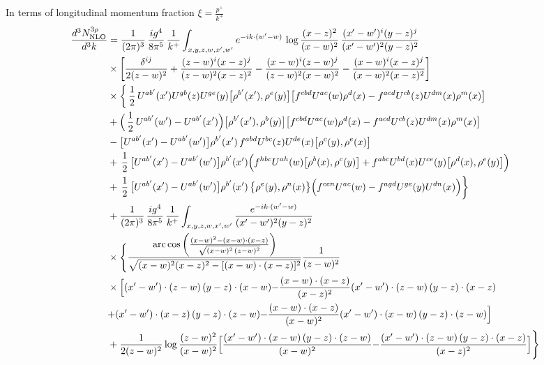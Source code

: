 \documentclass[9pt]{article}
\numberwithin{equation}{section}
\begin{document}
In terms of longitudinal momentum fraction $\xi = \frac{p^{+}}{k^{+}}$
\begin{align}
    \frac{d^{3}N^{3\rho}_{\rm NLO}}{d^{3}k}&=\frac{1}{(2\pi)^{3}}\,\frac{ig^{4}}{8\pi^{5}}\,\frac{1}{k^{+}}\int_{x,y,z,w,x',w'}e^{-ik\cdot(w'-w)}\,\log\frac{(x-z)^{2}}{(x-w)^{2}}\,\frac{(x'-w')^{i}(y-z)^{j}}{(x'-w')^{2}(y-z)^{2}}\notag\\
&\times\bigg[\frac{\delta^{ij}}{2(z-w)^{2}}+\frac{(z-w)^{i}(x-z)^{j}}{(z-w)^{2}(x-z)^{2}}-\frac{(x-w)^{i}(z-w)^{j}}{(z-w)^{2}(x-w)^{2}}-\frac{(x-w)^{i}(x-z)^{j}}{(x-w)^{2}(x-z)^{2}}\bigg]\notag\\
&\times\bigg\{\,\frac{1}{2}\,U^{ab'}(x')U^{gb}(z)U^{ge}(y)\big[\rho^{b'}(x'),\rho^{e}(y)\big]\big[f^{cbd}U^{ac}(w)\rho^{d}(x)-f^{acd}U^{cb}(z)U^{dm}(x)\rho^{m}(x)\big]\notag\\
&+\Big(\,\frac{1}{2}\,U^{ab'}(w')-U^{ab'}(x')\Big)\big[\rho^{b'}(x'),\rho^{b}(y)\big]\big[f^{cbd}U^{ac}(w)\rho^{d}(x)-f^{acd}U^{cb}(z)U^{dm}(x)\rho^{m}(x)\big]\notag\\
&-\big[U^{ab'}(x')-U^{ab'}(w')\big]\rho^{b'}(x')\,f^{abd}U^{bc}(z)U^{de}(x)\big[\rho^{c}(y),\rho^{e}(x)\big]\notag\\
&+\,\frac{1}{2}\,\big[U^{ab'}(x')-U^{ab'}(w')\big]\rho^{b'}(x')\Big(f^{hbc}U^{ah}(w)\big[\rho^{b}(x),\rho^{c}(y)\big]+f^{abc}U^{bd}(x)U^{ce}(y)\big[\rho^{d}(x),\rho^{e}(y)\big]\Big)\notag\\
&+\,\frac{1}{2}\,\big[U^{ab'}(x')-U^{ab'}(w')\big]\rho^{b'}(x')\,\big\{\rho^{e}(y),\rho^{n}(x)\big\}\Big(f^{cen}U^{ac}(w)-f^{agd}U^{ge}(y)U^{dn}(x)\Big)\bigg\}\notag\\
&+\frac{1}{(2\pi)^{3}}\,\frac{ig^{4}}{8\pi^{5}}\,\frac{1}{k^{+}}\int_{x,y,z,w,x',w'}\frac{e^{-ik\cdot(w'-w)}}{(x'-w')^{2}(y-z)^{2}}\notag\\
&\times\Bigg\{\frac{\mathrm{arc\,cos}\left(\frac{(x-w)^{2}-(x-w)\cdot (x-z)}{\sqrt{(x-w)^{2}\,(z-w)^{2}}}\right)}{\sqrt{(x-w)^{2}(x-z)^{2}-[(x-w)\cdot(x-z)]^{2}}}\frac{1}{(z-w)^{2}}\notag\\
&\times\Big[{(x'-w')\cdot(z-w)\,(y-z)\cdot(x-w)}{-\frac{(x-w)\cdot(x-z)}{(x-z)^{2}}(x'-w')\cdot(z-w)\,(y-z)\cdot(x-z)}\notag\\
&{+(x'-w')\cdot(x-z)\,(y-z)\cdot(z-w)}{-\frac{(x-w)\cdot(x-z)}{(x-w)^{2}}(x'-w')\cdot(x-w)\,(y-z)\cdot(z-w)}\Big]\notag\\
&+\frac{1}{2(z-w)^{2}}\log\frac{(z-w)^{2}}{(x-w)^{2}}\Big[{\frac{(x'-w')\cdot(x-w)\,(y-z)\cdot(z-w)}{(x-w)^{2}}}{-\frac{(x'-w')\cdot(z-w)\,(y-z)\cdot(x-z)}{(x-z)^{2}}}\Big]\Bigg\}\notag\\

\end{align}
\end{document}
